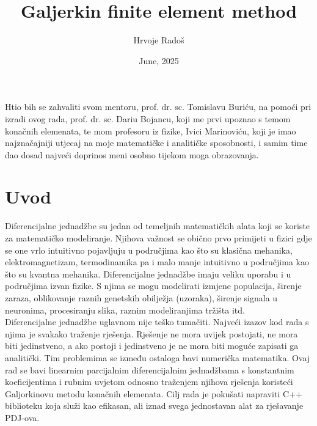 \documentclass[zavrsnirad]{../fer}
\title{Galjerkin finite element method}
\author{Hrvoje Radoš}
\date{June, 2025}
\begin{document}
\maketitle






\begin{zahvale}
Htio bih se zahvaliti svom mentoru,
prof. dr. sc. Tomislavu Buriću, 
na pomoći pri izradi ovog rada,
prof. dr. sc. Dariu Bojancu, koji me prvi upoznao
s temom konačnih elemenata, te mom profesoru iz fizike,
Ivici Marinoviću, koji je imao najznačajniji 
utjecaj na moje matematičke i analitičke sposobnosti,
i samim time dao dosad najveći
doprinos meni osobno tijekom moga obrazovanja.
\end{zahvale}


\mainmatter


{\large
\tableofcontents
}

\chapter{Uvod}
\label{pog:uvod}
Diferencijalne jednadžbe su jedan od temeljnih matematičkih
alata koji se koriste za matematičko modeliranje. Njihova
važnost se obično prvo primijeti u fizici gdje se one vrlo
intuitivno pojavljuju u područjima kao što su klasična mehanika,
elektromagnetizam, termodinamika pa i malo manje intuitivno u
područjima kao što su kvantna mehanika. Diferencijalne jednadžbe
imaju veliku uporabu i u područjima izvan fizike.
S njima se mogu modelirati izmjene populacija, širenje zaraza,
oblikovanje raznih genetskih obilježja (uzoraka),
širenje signala u neuronima, procesiranju slika, raznim
modeliranjima tržišta itd.
\bigskip
\\
Diferencijalne jednadžbe uglavnom nije teško tumačiti. Najveći
izazov kod rada s njima je svakako traženje rješenja.
Rješenje ne mora uvijek postojati, ne mora biti jedinstveno,
a ako postoji i jedinstveno je ne mora biti moguće zapisati
ga analitički. Tim problemima se između ostaloga bavi numerička
matematika. Ovaj rad se bavi linearnim parcijalnim diferencijalnim
jednadžbama s konstantnim koeficijentima i rubnim uvjetom odnosno
traženjem njihova rješenja koristeći Galjorkinovu metodu
konačnih elemenata. Cilj rada je pokušati  napraviti
C++ biblioteku koja služi kao efikasan, ali iznad svega
jednostavan alat za rješavanje PDJ-ova. 
\newpage
\end{document}
